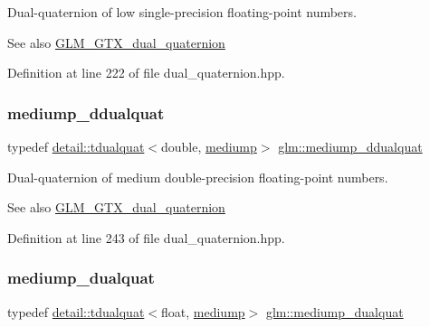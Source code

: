 Dual-\/quaternion of low single-\/precision floating-\/point numbers.

\begin{DoxySeeAlso}{See also}
\hyperlink{group__gtc__dual__quaternion}{G\+L\+M\+\_\+\+G\+T\+X\+\_\+dual\+\_\+quaternion} 
\end{DoxySeeAlso}


Definition at line 222 of file dual\+\_\+quaternion.\+hpp.

\mbox{\label{group__gtc__dual__quaternion_ga62d8cbf30e2afd0b1044204268a69066}} 
\subsubsection{\texorpdfstring{mediump\+\_\+ddualquat}{mediump\_ddualquat}}
{\footnotesize\ttfamily typedef \hyperlink{structglm_1_1detail_1_1tdualquat}{detail\+::tdualquat}$<$double, \hyperlink{namespaceglm_a0f04f086094c747d227af4425893f545a6416f3ea0c9025fb21ed50c4d6620482}{mediump}$>$ \hyperlink{group__gtc__dual__quaternion_ga62d8cbf30e2afd0b1044204268a69066}{glm\+::mediump\+\_\+ddualquat}}

Dual-\/quaternion of medium double-\/precision floating-\/point numbers.

\begin{DoxySeeAlso}{See also}
\hyperlink{group__gtc__dual__quaternion}{G\+L\+M\+\_\+\+G\+T\+X\+\_\+dual\+\_\+quaternion} 
\end{DoxySeeAlso}


Definition at line 243 of file dual\+\_\+quaternion.\+hpp.

\mbox{\label{group__gtc__dual__quaternion_ga71fc1c10a382330c1fee55ce29703405}} 
\subsubsection{\texorpdfstring{mediump\+\_\+dualquat}{mediump\_dualquat}}
{\footnotesize\ttfamily typedef \hyperlink{structglm_1_1detail_1_1tdualquat}{detail\+::tdualquat}$<$float, \hyperlink{namespaceglm_a0f04f086094c747d227af4425893f545a6416f3ea0c9025fb21ed50c4d6620482}{mediump}$>$ \hyperlink{group__gtc__dual__quaternion_ga71fc1c10a382330c1fee55ce29703405}{glm\+::mediump\+\_\+dualquat}}

